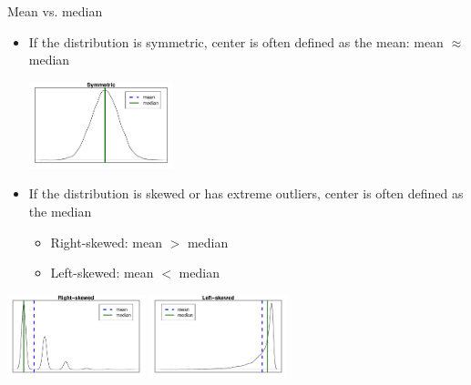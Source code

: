\documentclass[notes,11pt, aspectratio=169]{beamer}
\begin{document}
\begin{frame}[fragile]{Mean vs. median}

\begin{itemize}

\item If the distribution is symmetric, center is often defined as the mean: mean $\approx$ median

\begin{center}
\includegraphics[width=0.33\textwidth]{graphs/l02f11/sym}
\end{center}

\item If the distribution is skewed or has extreme outliers, center is often defined as the median
\begin{itemize}
\item Right-skewed: mean $>$ median
\item Left-skewed: mean $<$ median \\
\end{itemize}

\end{itemize}

\begin{center}
\includegraphics[width=0.3\textwidth]{graphs/l02f11/rs}
\includegraphics[width=0.3\textwidth]{graphs/l02f11/ls}\\
\end{center}

\end{frame}


\end{document}

